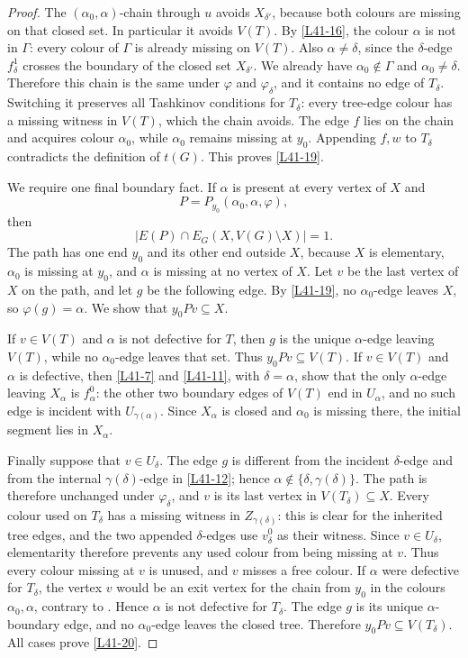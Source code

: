 \documentclass[11pt]{article}
\theoremstyle{definition}
\newcommand{\set}[1]{\{#1\}}
\newcommand{\comp}{\mathbin{\setminus}}
\begin{document}
\begin{proof}
The $(\alpha_0,\alpha)$-chain through $u$ avoids $X_{\delta'}$, because
both colours are missing on that closed set. In particular it avoids
$V(T)$. By \eqref{L41-16}, the colour $\alpha$ is not in $\Gamma$:
every colour of $\Gamma$ is already missing on $V(T)$. Also
$\alpha\ne\delta$, since the $\delta$-edge $f^1_\delta$ crosses the
boundary of the closed set $X_{\delta'}$. We already have
$\alpha_0\notin\Gamma$ and $\alpha_0\ne\delta$. Therefore this chain is
the same under $\varphi$ and $\varphi_\delta$, and it contains no edge of
$T_\delta$. Switching it preserves all Tashkinov conditions for
$T_\delta$: every tree-edge colour has a missing witness in $V(T)$, which
the chain avoids. The edge $f$ lies on the chain and acquires colour
$\alpha_0$, while $\alpha_0$ remains missing at $y_0$. Appending $f,w$ to
$T_\delta$ contradicts the definition of $t(G)$. This proves
\eqref{L41-19}.

We require one final boundary fact. If $\alpha$ is present at every vertex
of $X$ and
\[
 P=P_{y_0}(\alpha_0,\alpha,\varphi),
\]
then
\begin{equation}
 |E(P)\cap E_G(X,V(G)\comp X)|=1.
 \tag{20}\label{L41-20}
\end{equation}
The path has one end $y_0$ and its other end outside $X$, because $X$ is
elementary, $\alpha_0$ is missing at $y_0$, and $\alpha$ is missing at no
vertex of $X$. Let $v$ be the last vertex of $X$ on the path, and let $g$
be the following edge. By \eqref{L41-19}, no $\alpha_0$-edge leaves $X$,
so $\varphi(g)=\alpha$. We show that $y_0Pv\subseteq X$.

If $v\in V(T)$ and $\alpha$ is not defective for $T$, then $g$ is the
unique $\alpha$-edge leaving $V(T)$, while no $\alpha_0$-edge leaves that
set. Thus $y_0Pv\subseteq V(T)$. If $v\in V(T)$ and $\alpha$ is defective,
then \eqref{L41-7} and \eqref{L41-11}, with $\delta=\alpha$, show that the
only $\alpha$-edge leaving $X_\alpha$ is $f^0_\alpha$: the other two
boundary edges of $V(T)$ end in $U_\alpha$, and no such edge is incident
with $U_{\gamma(\alpha)}$. Since $X_\alpha$ is closed and
$\alpha_0$ is missing there, the initial segment lies in $X_\alpha$.

Finally suppose that $v\in U_\delta$. The edge $g$ is different from the
incident $\delta$-edge and from the internal
$\gamma(\delta)$-edge in \eqref{L41-12}; hence
$\alpha\notin\set{\delta,\gamma(\delta)}$. The path is therefore unchanged
under $\varphi_\delta$, and $v$ is its last vertex in
$V(T_\delta)\subseteq X$. Every colour used on $T_\delta$ has a missing witness in
$Z_{\gamma(\delta)}$: this is clear for the inherited tree edges, and the
two appended $\delta$-edges use $v^0_\delta$ as their witness. Since
$v\in U_\delta$, elementarity therefore prevents any used colour from
being missing at $v$. Thus every colour missing at $v$ is unused, and $v$
misses a free colour. If $\alpha$ were defective for
$T_\delta$, the vertex $v$ would be an exit vertex for the chain from
$y_0$ in the colours $\alpha_0,\alpha$, contrary to
. Hence $\alpha$ is not defective for $T_\delta$.
The edge $g$ is its unique $\alpha$-boundary edge, and no
$\alpha_0$-edge leaves the closed tree. Therefore
$y_0Pv\subseteq V(T_\delta)$. All cases prove \eqref{L41-20}.


\end{proof}
\end{document}
